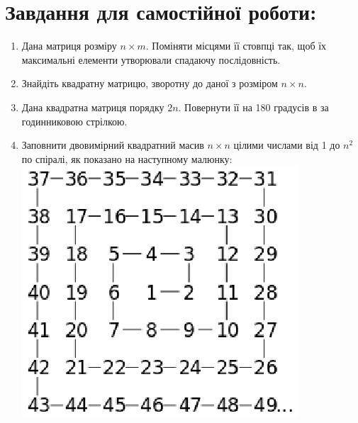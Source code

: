 \documentclass[a5paper,titlepage,openany,twoside,draft]{book_unv}%
\begin{document}
\section{Завдання для самостійної роботи:}

\begin{enumerate}
\def\labelenumi{\arabic{enumi})}
\setcounter{enumi}{6}
\item
  Дана матриця розміру $n \times m$. Поміняти місцями її стовпці так, щоб їх
  максимальні елементи утворювали спадаючу послідовність.
\item
  Знайдіть квадратну матрицю, зворотну до даної з розміром $n \times n$.
\item
  Дана квадратна матриця порядку $2n$. Повернути її на 180 градусів в
  за годинниковою стрілкою.

\item
  Заповнити двовимірний квадратний масив $n\times n$ цілими числами від 1 до $n^2$ по
  спіралі, як показано на наступному малюнку:\\
  \includegraphics{spiral5}
   

\end{enumerate}
\end{document}
